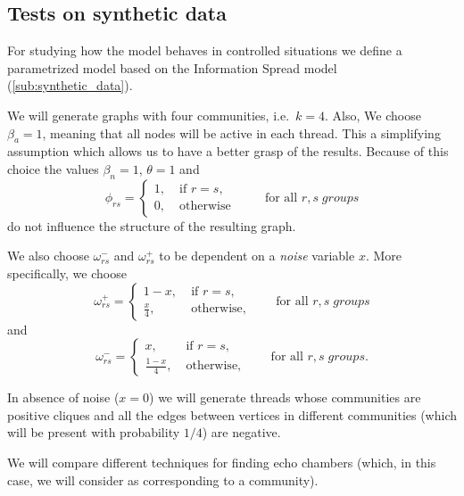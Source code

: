\subsection{Tests on synthetic data}%
\label{sub:testing_on_synthetic_data}

For studying how the model behaves in controlled situations we define a
parametrized model based on the Information Spread model
(\autoref{sub:synthetic_data}).

We will generate graphs with four communities, i.e.\ $k= 4$. Also, We choose $\beta _{a} = 1$, meaning that all nodes will be active in each
thread. This a
simplifying assumption which allows us to have a better grasp of the results.
Because of this choice the values $\beta _n = 1$, $\theta = 1$ and
\begin{equation}
	\phi_{rs}  =
	\begin{cases}
		1, \; & \text{if } r = s, \\
		0, \; & \text{otherwise }
	\end{cases} \quad\quad \text{for all } r,s \; groups
\end{equation}
do not influence the structure of the resulting graph.

We also choose $\omega ^{-} _{rs}$ and $\omega ^{+} _{rs} $ to be dependent on
a \emph{noise} variable $x$. More specifically, we choose
\begin{equation}
	\omega_{rs}^{+}   =
	\begin{cases}
		1 - x, \;        & \text{if } r = s, \\
		\frac{x}{4},  \; & \text{otherwise,}
	\end{cases} \quad\quad \text{for all } r,s \; groups
\end{equation}
and
\begin{equation}
	\omega_{rs}^{-}   =
	\begin{cases}
		x, \;                & \text{if } r = s, \\
		\frac{1 - x}{4},  \; & \text{otherwise,}
	\end{cases} \quad\quad \text{for all } r,s \; groups.
\end{equation}

In absence of noise ($x = 0$) we will generate threads whose communities are
positive cliques and all the edges between vertices in different communities
(which will be present with probability $1/4$) are negative.

We will compare different techniques for finding echo chambers (which,
in this case, we will consider as corresponding to a community).

